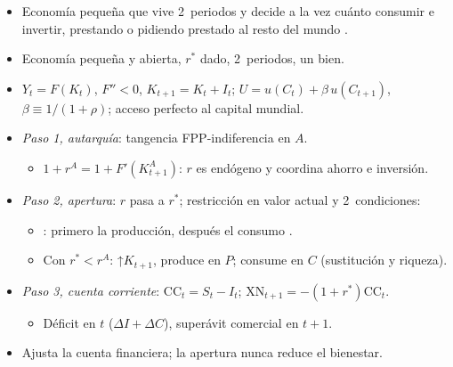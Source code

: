 \documentclass{article}
\begin{document}
\begin{columnas}
\begin{itemize}
\item Economía pequeña que vive 2~periodos y decide a la vez cuánto consumir e invertir, prestando o pidiendo prestado al resto del mundo .
\end{itemize}
\begin{itemize}
\item Economía pequeña y abierta, $r^*$ dado, 2~periodos, un bien.
\item $Y_t=F(K_t)$, $F''<0$, $K_{t+1}=K_t+I_t$; $U=u(C_t)+\beta\,u(C_{t+1})$, $\beta\equiv1/(1+\rho)$; acceso perfecto al capital mundial.
\end{itemize}
\begin{itemize}
\item \emph{Paso 1, autarquía}: tangencia FPP-indiferencia en $A$.
  \begin{itemize}
  \item $1+r^A=1+F'(K^A_{t+1})$: $r$ es endógeno y coordina ahorro e inversión.
  \end{itemize}
\item \emph{Paso 2, apertura}: $r$ pasa a $r^*$; restricción en valor actual y 2~condiciones:
  \begin{itemize}
  \item {}: primero la producción, después el consumo .
  \item Con $r^*<r^A$: ↑$K_{t+1}$, produce en $P$; consume en $C$ (sustitución y riqueza).
  \end{itemize}
\item \emph{Paso 3, cuenta corriente}: $\mathrm{CC}_t=S_t-I_t$; $\mathrm{XN}_{t+1}=-(1+r^*)\mathrm{CC}_t$.
  \begin{itemize}
  \item Déficit en $t$ ($\Delta I+\Delta C$), superávit comercial en $t+1$.
  \end{itemize}
\end{itemize}
\begin{itemize}
\item Ajusta la cuenta financiera; la apertura nunca reduce el bienestar.

\end{itemize}
\end{columnas}
\end{document}
